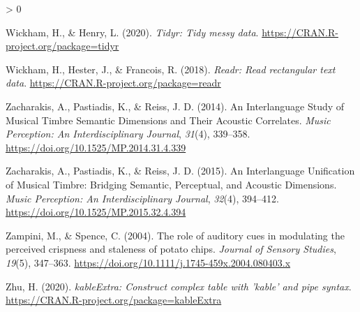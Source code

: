 \documentclass[
  english,
  man]{apa6}
\newlength{\cslhangindent}
\newenvironment{CSLReferences}[2] %
 {%
  \setlength{\parindent}{0pt}
  \ifodd #1 \everypar{\setlength{\hangindent}{\cslhangindent}}\ignorespaces\fi
  \ifnum #2 > 0
  \setlength{\parskip}{#2\baselineskip}
  \fi
 }%
 {}
\begin{document}
\begin{CSLReferences}{1}{0}
\leavevmode\hypertarget{ref-R-tidyr}{}%
Wickham, H., \& Henry, L. (2020). \emph{Tidyr: Tidy messy data}. \url{https://CRAN.R-project.org/package=tidyr}

\leavevmode\hypertarget{ref-R-readr}{}%
Wickham, H., Hester, J., \& Francois, R. (2018). \emph{Readr: Read rectangular text data}. \url{https://CRAN.R-project.org/package=readr}

\leavevmode\hypertarget{ref-Zacharakis2014}{}%
Zacharakis, A., Pastiadis, K., \& Reiss, J. D. (2014). {An Interlanguage Study of Musical Timbre Semantic Dimensions and Their Acoustic Correlates}. \emph{Music Perception: An Interdisciplinary Journal}, \emph{31}(4), 339--358. \url{https://doi.org/10.1525/MP.2014.31.4.339}

\leavevmode\hypertarget{ref-Zacharakis2015}{}%
Zacharakis, A., Pastiadis, K., \& Reiss, J. D. (2015). {An Interlanguage Unification of Musical Timbre: Bridging Semantic, Perceptual, and Acoustic Dimensions}. \emph{Music Perception: An Interdisciplinary Journal}, \emph{32}(4), 394--412. \url{https://doi.org/10.1525/MP.2015.32.4.394}

\leavevmode\hypertarget{ref-Zampini2004}{}%
Zampini, M., \& Spence, C. (2004). {The role of auditory cues in modulating the perceived crispness and staleness of potato chips}. \emph{Journal of Sensory Studies}, \emph{19}(5), 347--363. \url{https://doi.org/10.1111/j.1745-459x.2004.080403.x}

\leavevmode\hypertarget{ref-R-kableExtra}{}%
Zhu, H. (2020). \emph{kableExtra: Construct complex table with 'kable' and pipe syntax}. \url{https://CRAN.R-project.org/package=kableExtra}

\end{CSLReferences}

\endgroup
\end{document}
